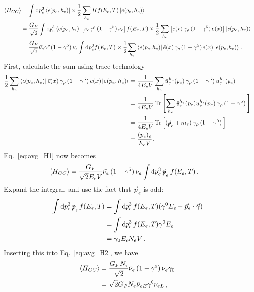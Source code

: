 \begin{align}\label{eq:avg_H1}
    \left\langle {H_{CC}} \right \rangle &= \int \dd p_e^3 \bra{e(p_e,h_e)} \times \frac{1}{2} \sum_{h_e} H   f(E_e,T) \ket{e(p_e,h_e)} \nonumber \\
           &= \frac{G_F}{\sqrt{2}} \int \dd p_e^3 \bra{e(p_e,h_e)} \left[ \bar{\nu_e} \gamma^\rho\, (1- \gamma^5)\, \nu_e \right]  f(E_e,T) \times \frac{1}{2} \sum_{h_e} \left[\bar e(x) \,\gamma_\rho\, (1- \gamma^5)\, e(x) \right] \ket{e(p_e,h_e)} \nonumber \\
           &= \frac{G_F}{\sqrt{2}} \bar{\nu_e} \gamma^\rho\, (1- \gamma^5)\, \nu_e \int \dd p_e^3  f(E_e,T) \times \frac{1}{2} \sum_{h_e} \bra{e(p_e,h_e)} \bar e(x) \,\gamma_\rho\, (1- \gamma^5)\, e(x)   \ket{e(p_e,h_e)}\,.
\end{align}
First, calculate the sum using trace technology
\begin{align}\label{eq:helicity_sum}
    \frac{1}{2} \sum_{h_e} \bra{e(p_e,h_e)} \bar e(x) \,\gamma_\rho\, (1- \gamma^5)\, e(x)   \ket{e(p_e,h_e)} &= \frac{1}{4E_e V} \sum_{h_e} \bar{u}_e^{h_e}(p_e) \,\gamma_\rho\, (1- \gamma^5)\, u_e^{h_e}(p_e) \nonumber \\
    &= \frac{1}{4 E_e V} \Trace{\left[ \sum_{h_e} \bar{u}_e^{h_e}(p_e) u_e^{h_e}(p_e) \,\gamma_\rho\, (1- \gamma^5)\, \right]} \nonumber \\
    &= \frac{1}{4 E_e V} \Trace{\left[ (\slashed{p}_e + m_e ) \,\gamma_\rho\, (1- \gamma^5)\, \right]} \nonumber \\
    &= \frac{(p_e)_\rho}{E_e V}\,.
\end{align}
Eq.~\ref{eq:avg_H1} now becomes 
\begin{align}\label{eq:avg_H2}
    \left\langle {H_{CC}} \right \rangle &= \frac{G_F}{\sqrt{2}E_e V} \bar{\nu_e} \, (1- \gamma^5)\, \nu_e \int \dd p_e^3\, \slashed{p}_e\, f(E_e,T)\,.
\end{align}
Expand the integral, and use the fact that $\vec{p}_e$ is odd:
\begin{align}
    \int \dd p_e^3\, \slashed{p}_e\, f(E_e,T) &= \int \dd p_e^3\, f(E_e,T) (\gamma^0 E_e - \vec{p}_e \cdot \vec{\gamma}) \nonumber \\
                                              &= \int \dd p_e^3\, f(E_e,T) \gamma^0 E_e \nonumber \\
                                              &= \gamma_0 E_e N_e V\,.
\end{align}
Inserting this into Eq.~\ref{eq:avg_H2}, we have
\begin{align}
    \left\langle {H_{CC}} \right \rangle &= \frac{G_F N_e}{\sqrt{2}} \bar{\nu}_e \, (1- \gamma^5)\, \nu_e \gamma_0 \nonumber \\
            &= \sqrt{2}G_F N_e \bar{\nu}_{eE} \gamma^0 \nu_{eL}\,,
\end{align}
